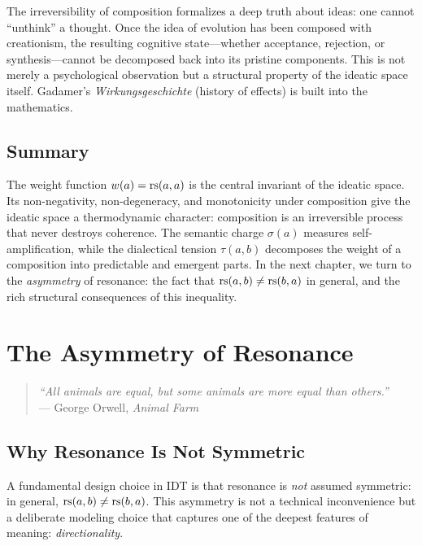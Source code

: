 \begin{interpretation}
The irreversibility of composition formalizes a deep truth about ideas:
one cannot ``unthink'' a thought. Once the idea of evolution has been
composed with creationism, the resulting cognitive state---whether
acceptance, rejection, or synthesis---cannot be decomposed back into
its pristine components. This is not merely a psychological observation
but a structural property of the ideatic space itself. Gadamer's
\emph{Wirkungsgeschichte} (history of effects) is built into the
mathematics.
\end{interpretation}

\section{Summary}

The weight function $w(a) = \mathrm{rs}(a,a)$ is the central invariant of the
ideatic space. Its non-negativity, non-degeneracy, and monotonicity under
composition give the ideatic space a thermodynamic character: composition is
an irreversible process that never destroys coherence. The semantic charge
$\sigma(a)$ measures self-amplification, while the dialectical tension
$\tau(a,b)$ decomposes the weight of a composition into predictable and
emergent parts. In the next chapter, we turn to the \emph{asymmetry} of
resonance: the fact that $\mathrm{rs}(a,b) \neq \mathrm{rs}(b,a)$ in general, and the
rich structural consequences of this inequality.



\chapter{The Asymmetry of Resonance}

\begin{quote}
\textit{``All animals are equal, but some animals are more equal than
others.''}\\
\hfill --- George Orwell, \textit{Animal Farm}
\end{quote}

\section{Why Resonance Is Not Symmetric}

A fundamental design choice in IDT is that resonance is \emph{not} assumed
symmetric: in general, $\mathrm{rs}(a,b) \neq \mathrm{rs}(b,a)$. This asymmetry is not a
technical inconvenience but a deliberate modeling choice that captures one
of the deepest features of meaning: \emph{directionality}.

